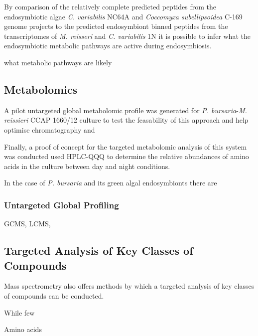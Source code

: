 By comparison of the relatively complete predicted peptides from 
the endosymbiotic algae \textit{C. variabilis} NC64A and \textit{Coccomyxa
subellipsoidea} C-169 genome projects to the predicted endosymbiont binned peptides
from the transcriptomes of \textit{M. reisseri} and \textit{C. variabilis} 1N
it is possible to infer what the endosymbiotic metabolic pathways
are active during endosymbiosis. 













what metabolic pathways are likely










\subsection{Metabolomics}


A pilot untargeted global metabolomic profile was generated
for \textit{P. bursaria}-\textit{M. reissieri} CCAP 1660/12 
culture to test the feasability of this approach and help optimise
chromatography and 

Finally, a proof of concept for the targeted metabolomic
analysis of this system was conducted used HPLC-QQQ
to determine the relative abundances of amino acids
in the culture between day and night conditions. 

In the case of \textit{P. bursaria} and its green algal endosymbionts 
there are



\subsubsection{Untargeted Global Profiling}
GCMS, LCMS,

\subsection{Targeted Analysis of Key Classes of Compounds}

Mass spectrometry also offers methods by which a targeted 
analysis of key classes of compounds can be conducted. 


While few

Amino acids 



